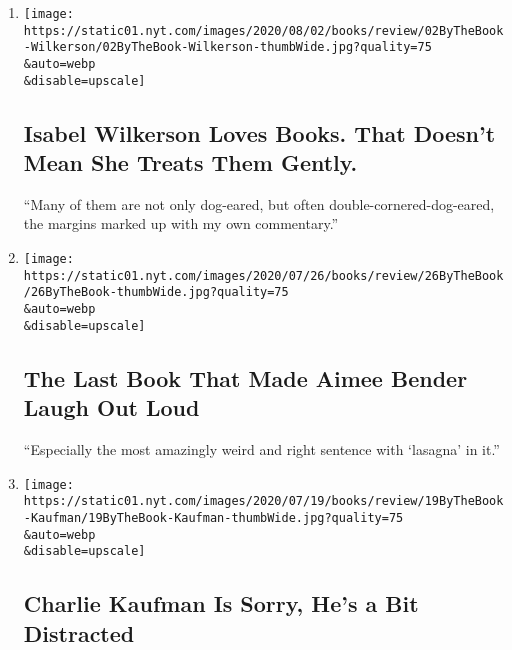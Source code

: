 \begin{enumerate}
\def\labelenumi{\arabic{enumi}.}
\item
  \href{/2020/07/30/books/review/isabel-wilkerson-by-the-book-interview.html}{}

  \texttt{[image: https://static01.nyt.com/images/2020/08/02/books/review/02ByTheBook-Wilkerson/02ByTheBook-Wilkerson-thumbWide.jpg?quality=75\\\&auto=webp\\\&disable=upscale]}

  \hypertarget{isabel-wilkerson-loves-books-that-doesnt-mean-she-treats-them-gently}{%
  \subsection{Isabel Wilkerson Loves Books. That Doesn't Mean She Treats
  Them
  Gently.}\label{isabel-wilkerson-loves-books-that-doesnt-mean-she-treats-them-gently}}

  ``Many of them are not only dog-eared, but often
  double-cornered-dog-eared, the margins marked up with my own
  commentary.''
\item
  \href{/2020/07/23/books/review/aimee-bender-by-the-book-interview.html}{}

  \texttt{[image: https://static01.nyt.com/images/2020/07/26/books/review/26ByTheBook/26ByTheBook-thumbWide.jpg?quality=75\\\&auto=webp\\\&disable=upscale]}

  \hypertarget{the-last-book-that-made-aimee-bender-laugh-out-loud}{%
  \subsection{The Last Book That Made Aimee Bender Laugh Out
  Loud}\label{the-last-book-that-made-aimee-bender-laugh-out-loud}}

  ``Especially the most amazingly weird and right sentence with
  `lasagna' in it.''
\item
  \href{/2020/07/16/books/review/charlie-kaufman-by-the-book-interview.html}{}

  \texttt{[image: https://static01.nyt.com/images/2020/07/19/books/review/19ByTheBook-Kaufman/19ByTheBook-Kaufman-thumbWide.jpg?quality=75\\\&auto=webp\\\&disable=upscale]}

  \hypertarget{charlie-kaufman-is-sorry-hes-a-bit-distracted}{%
  \subsection{Charlie Kaufman Is Sorry, He's a Bit
  Distracted}\label{charlie-kaufman-is-sorry-hes-a-bit-distracted}}


\end{enumerate}
